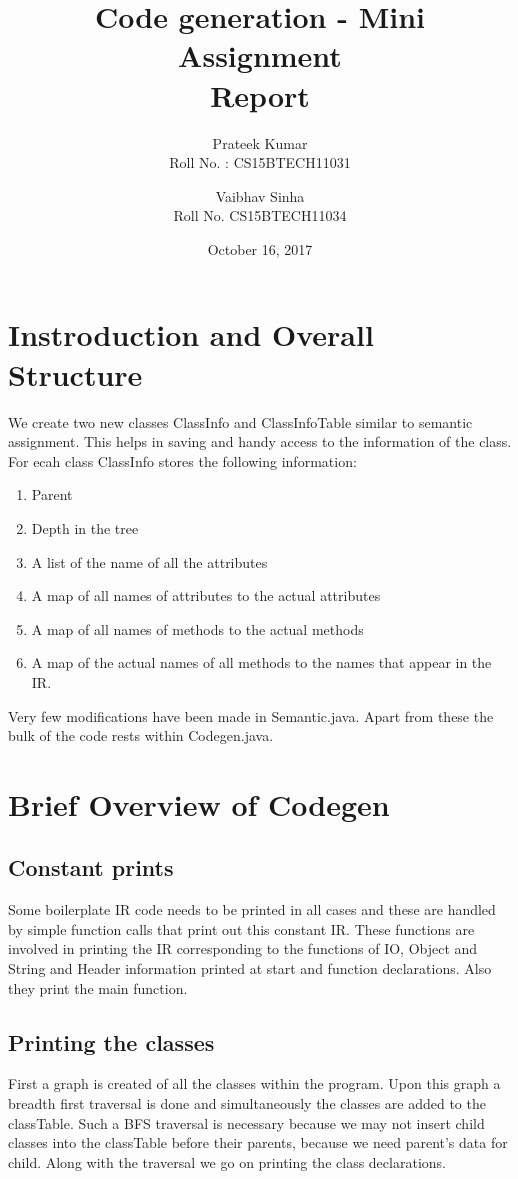 \documentclass{article}
\title{Code generation - Mini Assignment\\ Report}
\author{Prateek Kumar\\ Roll No. : CS15BTECH11031 \and Vaibhav Sinha\\ Roll No. CS15BTECH11034}
\date{October 16, 2017}
\begin{document}
	
\maketitle

\section{Instroduction and Overall Structure}

We create two new classes ClassInfo and ClassInfoTable similar to semantic assignment. This helps in saving and handy access to the information of the class. For ecah class ClassInfo stores the following information:
\begin{enumerate}
	\item Parent
	\item Depth in the tree
	\item A list  of the name of all the attributes
	\item A map of all names of attributes to the actual attributes
	\item A map of all names of methods to the actual methods
	\item A map of the actual names of all methods to the names that appear in the IR.
\end{enumerate}
Very few modifications have been made in Semantic.java. Apart from these the bulk of the code rests within Codegen.java.

\section{Brief Overview of Codegen}

\subsection{Constant prints}

Some boilerplate IR code needs to be printed in all cases and these are handled by simple function calls that print out this constant IR. These functions are involved in printing the IR corresponding to the functions of IO, Object and String and Header information printed at start and function declarations. Also they print the main function.

\subsection{Printing the classes}

First a graph is created of all the classes within the program. Upon this graph a breadth first traversal is done and simultaneously the classes are added to the classTable. Such a BFS traversal is necessary because we may not insert child classes into the classTable before their parents, because we need parent’s data for child. Along with the traversal we go on printing the class declarations.
\end{document}

